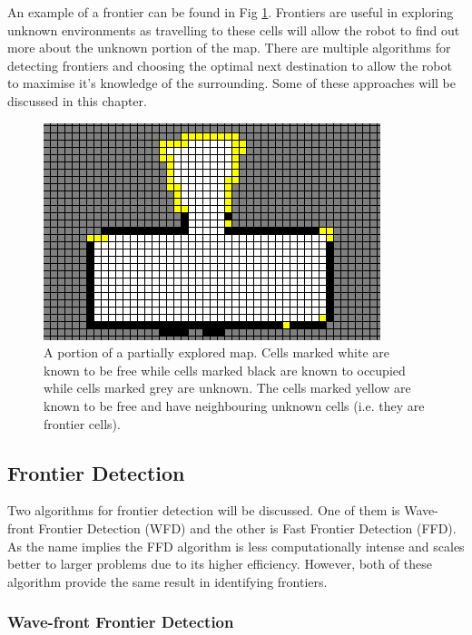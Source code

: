 \documentclass[a4paper,12pt]{article}
\begin{document}
			An example of a frontier can be found in Fig \ref{frontierExample}. Frontiers are useful in exploring unknown environments as travelling to these cells will allow the robot to find out more about the unknown portion of the map. There are multiple algorithms for detecting frontiers and choosing the optimal next destination to allow the robot to maximise it's knowledge of the surrounding. Some of these approaches will be discussed in this chapter.

			\begin{figure}[H]
				\centering
				\includegraphics[scale=0.6]{images/frontierExample.png}
				\caption{A portion of a partially explored map. Cells marked white are known to be free while cells marked black are known to occupied while cells marked grey are unknown. The cells marked yellow are known to be free and have neighbouring unknown cells (i.e. they are frontier cells).}
				\label{frontierExample}
			\end{figure}

			\subsection{Frontier Detection}

				Two algorithms for frontier detection will be discussed. One of them is Wave-front Frontier Detection (WFD) and the other is Fast Frontier Detection (FFD). As the name implies the FFD algorithm is less computationally intense and scales better to larger problems due to its higher efficiency. However, both of these algorithm provide the same result in identifying frontiers.
				
				\subsubsection{Wave-front Frontier Detection}
\end{document}
